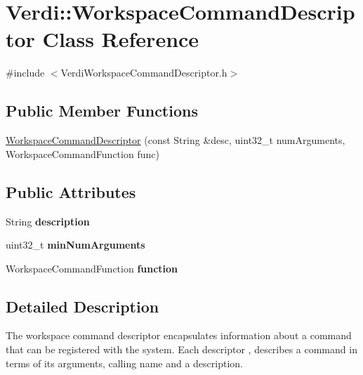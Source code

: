 \hypertarget{class_verdi_1_1_workspace_command_descriptor}{\section{\-Verdi\-:\-:\-Workspace\-Command\-Descriptor \-Class \-Reference}
\label{class_verdi_1_1_workspace_command_descriptor}
}


{\ttfamily \#include $<$\-Verdi\-Workspace\-Command\-Descriptor.\-h$>$}

\subsection*{\-Public \-Member \-Functions}
\begin{DoxyCompactItemize}
\item 
\hyperlink{class_verdi_1_1_workspace_command_descriptor_a68da0db9a212b1823663418b3ff0b9cc}{\-Workspace\-Command\-Descriptor} (const \-String \&desc, uint32\-\_\-t num\-Arguments, \-Workspace\-Command\-Function func)
\end{DoxyCompactItemize}
\subsection*{\-Public \-Attributes}
\begin{DoxyCompactItemize}
\item 
\hypertarget{class_verdi_1_1_workspace_command_descriptor_a4347e3424698beca42c2f8e9f4036149}{\-String {\bfseries description}}\label{class_verdi_1_1_workspace_command_descriptor_a4347e3424698beca42c2f8e9f4036149}

\item 
\hypertarget{class_verdi_1_1_workspace_command_descriptor_a89487555e5e213cfad9fb74c1c1f59a0}{uint32\-\_\-t {\bfseries min\-Num\-Arguments}}\label{class_verdi_1_1_workspace_command_descriptor_a89487555e5e213cfad9fb74c1c1f59a0}

\item 
\hypertarget{class_verdi_1_1_workspace_command_descriptor_a46d55b042d609d93f484394814351a9f}{\-Workspace\-Command\-Function {\bfseries function}}\label{class_verdi_1_1_workspace_command_descriptor_a46d55b042d609d93f484394814351a9f}

\end{DoxyCompactItemize}


\subsection{\-Detailed \-Description}
\-The workspace command descriptor encapsulates information about a command that can be registered with the system. \-Each descriptor , describes a command in terms of its arguments, calling name and a description. 

